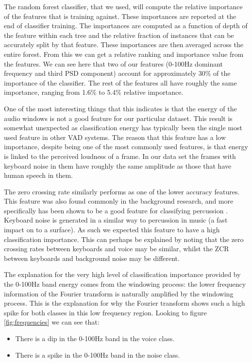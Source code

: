 \documentclass[ %
                    author={Sam Phippen},
                supervisor={Dr. Rafal Bogacz},
                     title={Real time voice activity detectors in noisy personal computing environments},
                  subtitle={},
                    degree={MEng},
                      year={2012} ]{thesis}
\begin{document}
The random forest classifier, that we used, will compute the relative
importance of the features that is training against. These importances are
reported at the end of classifier training. The importances are computed as a
function of depth of the feature within each tree and the relative fraction of
instances that can be accurately split by that feature. These importances are
then averaged across the entire forest. From this we can get a relative ranking
and importance value from the features. We can see here that two of our
features (0-100Hz dominant frequency and third PSD component) account for
approximately 30\% of the importance of the classifier. The rest of the
features all have roughly the same importance, ranging from 1.6\% to
5.4\% relative importance.

One of the most interesting things that this indicates is that the energy of
the audio windows is not a good feature for our particular dataset. This result
is somewhat unexpected as classification energy has typically been the single
most used feature in other VAD systems. The reason that this feature has a low
importance, despite being one of the most commonly used features, is that
energy is linked to the perceived loudness of a frame. In our data set the
frames with keyboard noise in them have roughly the same amplitude as those
that have human speech in them.

The zero crossing rate similarly performs as one of the lower accuracy
features. This feature was also found commonly in the background research, and
more specifically has been shown to be a good feature for classifying
percussion \cite{gouyon}. Keyboard noise is generated in a similar way to
percussion in music (a fast impact on to a surface). As such we expected this
feature to have a high classification importance. This can perhaps be explained
by noting that the zero crossing rates between keyboards and voice may be
similar, whilst the ZCR between keyboards and background noise may be
different.

The explanation for the very high level of classification importance provided
by the 0-100Hz band energy comes from the windowing process: the lower
frequency information of the Fourier transform is naturally amplified by the
windowing process. This is the explanation for why the Fourier transform shows
such a high spike for both classes in this low frequency region. Looking to
figure \ref{fig:frequencies} we can see that:

\begin{itemize}

    \item There is a dip in the 0-100Hz band in the voice class.

    \item There is a spike in the 0-100Hz band in the noise class.

\end{itemize}
\end{document}
